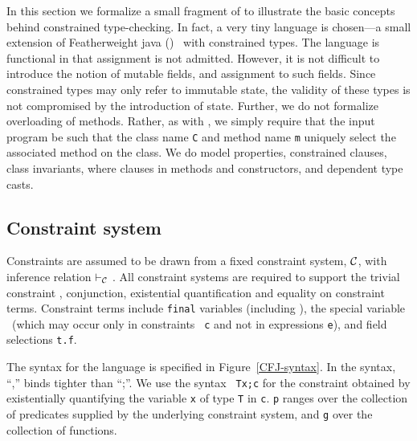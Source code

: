 \def\TConstr{\mbox{\sc T-Constr}}
\def\TInv{\mbox{\sc T-Inv}}
\def\TVar{\mbox{\sc T-Var}}
\def\TField{\mbox{\sc T-Field}}
\def\TInvk{\mbox{\sc T-Invk}}
\def\TNew{\mbox{\sc T-New}}
\def\TCast{\mbox{\sc T-Cast}}
\def\TUCast{\mbox{\sc T-UCast}}
\def\TDCast{\mbox{\sc T-DCast}}
\def\TSCast{\mbox{\sc T-SCast}}

\def\RField{\mbox{\sc R-Field}}
\def\RCField{\mbox{\sc RC-Field}}
\def\RInvk{\mbox{\sc R-Invk}}
\def\RCInvkRecv{\mbox{\sc RC-Invk-Recv}}
\def\RCInvkArg{\mbox{\sc RC-Invk-Arg}}
\def\RCNewArg{\mbox{\sc RC-New-Arg}}
\def\RCast{\mbox{\sc R-Cast}}
\def\RCCast{\mbox{\sc RC-Cast}}

In this section we formalize a small fragment of \Xten{} to illustrate
the basic concepts behind constrained type-checking.  In fact, a very
tiny language is chosen---a small extension of Featherweight
java (\FJ{})~\cite{FJ} with constrained
types. 
%
The language is functional in that assignment is not
admitted. However, it is not difficult to introduce the notion of
mutable fields, and assignment to such fields. Since constrained types
may only refer to immutable state, the validity of these types is not
compromised by the introduction of state.
%
Further, we do not formalize overloading of methods. Rather, as
with \FJ{}, we simply require that the input program be such that the class
name {\tt C} and method name {\tt m} uniquely select the associated
method on the class. 
%
We do model properties, constrained clauses, class invariants, where
clauses in methods and constructors, and dependent type casts.

\subsection{Constraint system}

Constraints are assumed to be drawn from a fixed constraint system,
$\cal C$, with inference relation $\vdash_{\cal C}$ \cite{CCCC}.
All
constraint systems are required to support the trivial constraint
\true, conjunction, existential quantification and equality on
constraint terms. Constraint terms include {\tt final} variables
(including \this), the
special variable \self\ (which may occur only in constraints {\tt
c} and not in expressions {\tt e}), and field selections {\tt t.f}. 

The syntax for the language is specified in Figure~\ref{CFJ-syntax}.
In the syntax, ``,'' binds tighter than ``;''. We use the syntax {\tt
{\tt T\;x};\;c} for the constraint obtained by existentially quantifying the
variable {\tt x} of type {\tt T} in {\tt c}. {\tt p} ranges over
the collection of predicates supplied by the underlying constraint
system, and {\tt g} over the collection of functions.

